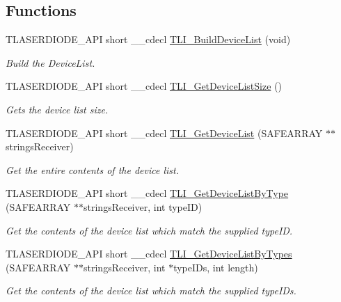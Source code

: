 \subsection*{Functions}
\begin{DoxyCompactItemize}
\item 
T\+L\+A\+S\+E\+R\+D\+I\+O\+D\+E\+\_\+\+A\+PI short \+\_\+\+\_\+cdecl \hyperlink{group___t_cube_laser_diode_ga54badd76b9e4d03362b6d8be5d09226a}{T\+L\+I\+\_\+\+Build\+Device\+List} (void)
\begin{DoxyCompactList}\small\item\em Build the Device\+List. \end{DoxyCompactList}\item 
T\+L\+A\+S\+E\+R\+D\+I\+O\+D\+E\+\_\+\+A\+PI short \+\_\+\+\_\+cdecl \hyperlink{group___t_cube_laser_diode_ga55b0b2d0c63ffcf4901a055e5dfef0d8}{T\+L\+I\+\_\+\+Get\+Device\+List\+Size} ()
\begin{DoxyCompactList}\small\item\em Gets the device list size. \end{DoxyCompactList}\item 
T\+L\+A\+S\+E\+R\+D\+I\+O\+D\+E\+\_\+\+A\+PI short \+\_\+\+\_\+cdecl \hyperlink{group___t_cube_laser_diode_ga21e824d488e30ebc339ec324bf02a59e}{T\+L\+I\+\_\+\+Get\+Device\+List} (S\+A\+F\+E\+A\+R\+R\+AY $\ast$$\ast$strings\+Receiver)
\begin{DoxyCompactList}\small\item\em Get the entire contents of the device list. \end{DoxyCompactList}\item 
T\+L\+A\+S\+E\+R\+D\+I\+O\+D\+E\+\_\+\+A\+PI short \+\_\+\+\_\+cdecl \hyperlink{group___t_cube_laser_diode_ga2021439a763b3cf60264b84c1fd5dba7}{T\+L\+I\+\_\+\+Get\+Device\+List\+By\+Type} (S\+A\+F\+E\+A\+R\+R\+AY $\ast$$\ast$strings\+Receiver, int type\+ID)
\begin{DoxyCompactList}\small\item\em Get the contents of the device list which match the supplied type\+ID. \end{DoxyCompactList}\item 
T\+L\+A\+S\+E\+R\+D\+I\+O\+D\+E\+\_\+\+A\+PI short \+\_\+\+\_\+cdecl \hyperlink{group___t_cube_laser_diode_ga36655ee4428bed89ecd6d13fc57eac77}{T\+L\+I\+\_\+\+Get\+Device\+List\+By\+Types} (S\+A\+F\+E\+A\+R\+R\+AY $\ast$$\ast$strings\+Receiver, int $\ast$type\+I\+Ds, int length)
\begin{DoxyCompactList}\small\item\em Get the contents of the device list which match the supplied type\+I\+Ds. \end{DoxyCompactList}\item 
$$
\end{DoxyCompactItemize}
